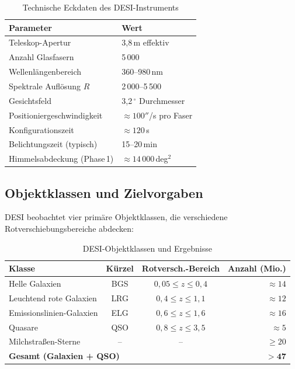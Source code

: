 ﻿\documentclass[a4paper,12pt]{article}
\theoremstyle{definition}
\theoremstyle{remark}
\begin{document}
\begin{table}[H]
  \centering
  \caption{Technische Eckdaten des DESI-Instruments}
  \label{tab:desi_specs}
  \begin{tabular}{ll}
    \toprule
    \textbf{Parameter} & \textbf{Wert} \\
    \midrule
    Teleskop-Apertur & 3{,}8\,m effektiv \\
    Anzahl Glasfasern & 5\,000 \\
    Wellenlängenbereich & 360--980\,nm \\
    Spektrale Auflösung $R$ & 2\,000--5\,500 \\
    Gesichtsfeld & 3{,}2\,$^\circ$ Durchmesser \\
    Positioniergeschwindigkeit & $\approx 100''$/s pro Faser \\
    Konfigurationszeit & $\approx 120$\,s \\
    Belichtungszeit (typisch) & 15--20\,min \\
    Himmelsabdeckung (Phase\,1) & $\approx 14\,000$\,deg$^2$ \\
    \bottomrule
  \end{tabular}
\end{table}

\subsection{Objektklassen und Zielvorgaben}

DESI beobachtet vier primäre Objektklassen, die verschiedene Rotverschiebungsbereiche
abdecken:

\begin{table}[H]
  \centering
  \caption{DESI-Objektklassen und Ergebnisse}
  \label{tab:objekte}
  \begin{tabular}{lccr}
    \toprule
    \textbf{Klasse} & \textbf{Kürzel} & \textbf{Rotversch.-Bereich} & \textbf{Anzahl (Mio.)} \\
    \midrule
    Helle Galaxien & BGS & $0{,}05 \leq z \leq 0{,}4$ & $\approx 14$ \\
    Leuchtend rote Galaxien & LRG & $0{,}4 \leq z \leq 1{,}1$ & $\approx 12$ \\
    Emissionslinien-Galaxien & ELG & $0{,}6 \leq z \leq 1{,}6$ & $\approx 16$ \\
    Quasare & QSO & $0{,}8 \leq z \leq 3{,}5$ & $\approx 5$ \\
    Milchstraßen-Sterne & -- & -- & $\geq 20$ \\
    \bottomrule
    \multicolumn{3}{l}{\textbf{Gesamt (Galaxien + QSO)}} & $\mathbf{> 47}$ \\
    \bottomrule
  \end{tabular}
\end{table}
\end{document}
